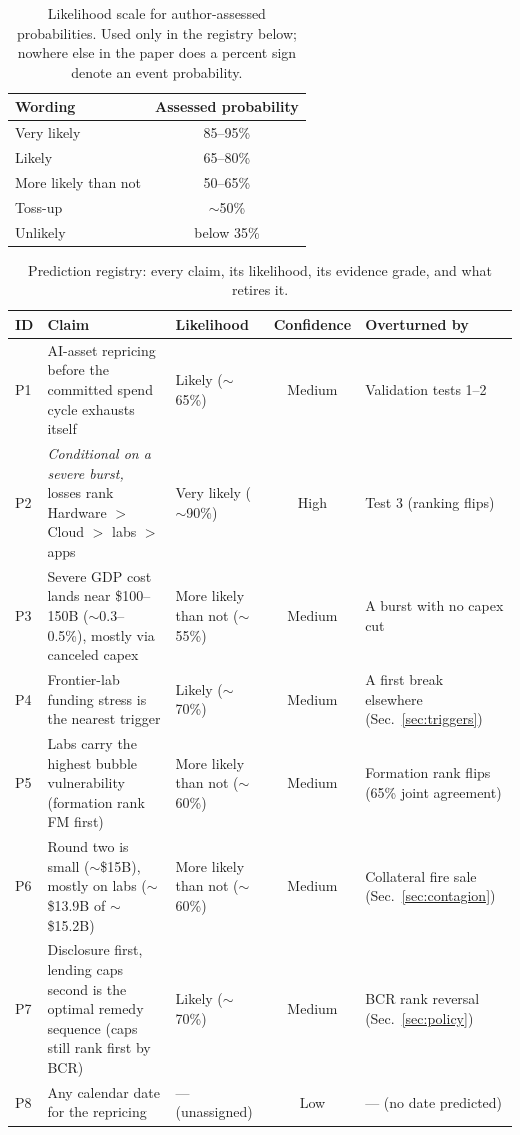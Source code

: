 \documentclass[11pt,a4paper]{article}
\begin{document}
\begin{table}[htbp]
\centering
\caption{Likelihood scale for author-assessed probabilities. Used only in the registry below; nowhere else in the paper does a percent sign denote an event probability.}
\label{tab:likelihood-scale}
\begin{tabular}{lc}
\toprule
Wording & Assessed probability \\
\midrule
Very likely & 85--95\% \\
Likely & 65--80\% \\
More likely than not & 50--65\% \\
Toss-up & $\sim$50\% \\
Unlikely & below 35\% \\
\bottomrule
\end{tabular}
\end{table}

\begin{table}[htbp]
\centering
\caption{Prediction registry: every claim, its likelihood, its evidence grade, and what retires it.}
\label{tab:registry}
\begin{tabular}{l>{\raggedright\arraybackslash}p{4.4cm}>{\raggedright\arraybackslash}p{2.7cm}c>{\raggedright\arraybackslash}p{3.0cm}}
\toprule
ID & Claim & Likelihood & Confidence & Overturned by \\
\midrule
P1 & AI-asset repricing before the committed spend cycle exhausts itself & Likely ($\sim$65\%) & Medium & Validation tests 1--2 \\
P2 & \emph{Conditional on a severe burst,} losses rank Hardware $>$ Cloud $>$ labs $>$ apps & Very likely ($\sim$90\%) & High & Test 3 (ranking flips) \\
P3 & Severe GDP cost lands near \$100--150B ($\sim$0.3--0.5\%), mostly via canceled capex & More likely than not ($\sim$55\%) & Medium & A burst with no capex cut \\
P4 & Frontier-lab funding stress is the nearest trigger & Likely ($\sim$70\%) & Medium & A first break elsewhere (Sec.~\ref{sec:triggers}) \\
P5 & Labs carry the highest bubble vulnerability (formation rank FM first) & More likely than not ($\sim$60\%) & Medium & Formation rank flips (65\% joint agreement) \\
P6 & Round two is small ($\sim$\$15B), mostly on labs ($\sim$\$13.9B of $\sim$\$15.2B) & More likely than not ($\sim$60\%) & Medium & Collateral fire sale (Sec.~\ref{sec:contagion}) \\
P7 & Disclosure first, lending caps second is the optimal remedy sequence (caps still rank first by BCR) & Likely ($\sim$70\%) & Medium & BCR rank reversal (Sec.~\ref{sec:policy}) \\
P8 & Any calendar date for the repricing & --- (unassigned) & Low & --- (no date predicted) \\
\bottomrule
\end{tabular}
\end{table}
\end{document}
